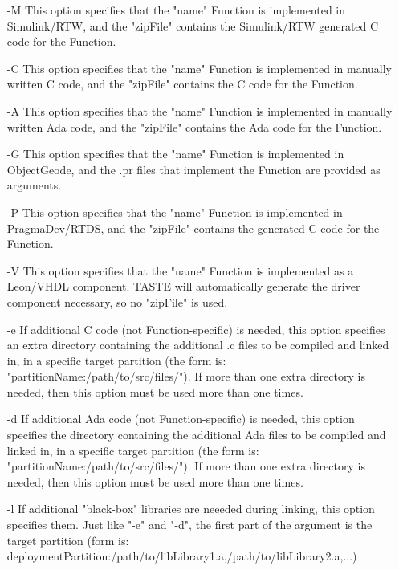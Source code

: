 \documentclass[11pt]{book}
\begin{document}
\begin{itemize}
\item[-M] This option specifies that the "name" Function is implemented in Simulink/RTW,
        and the "zipFile" contains the Simulink/RTW generated C code for the Function.

\item[-C] This option specifies that the "name" Function is implemented in manually written C code,
        and the "zipFile" contains the C code for the Function.

\item[-A] This option specifies that the "name" Function is implemented in manually written Ada code,
        and the "zipFile" contains the Ada code for the Function.

\item[-G] This option specifies that the "name" Function is implemented in ObjectGeode,
        and the .pr files that implement the Function are provided as arguments.

\item[-P] This option specifies that the "name" Function is implemented in PragmaDev/RTDS,
        and the "zipFile" contains the generated C code for the Function.

\item[-V] This option specifies that the "name" Function is implemented as a Leon/VHDL component.
        TASTE will automatically generate the driver component necessary, so no "zipFile" is used.

\item[-e] If additional C code (not Function-specific) is needed, this option specifies an extra directory 
         containing the additional .c files to be compiled and linked in, in a specific target partition 
	 (the form is: "partitionName:/path/to/src/files/"). If more than one extra directory is
         needed, then this option must be used more than one times.

\item[-d] If additional Ada code (not Function-specific) is needed, this option specifies the directory 
         containing the additional Ada files to be compiled and linked in, in a specific target partition 
	 (the form is: "partitionName:/path/to/src/files/"). If more than one extra directory is
         needed, then this option must be used more than one times.

\item[-l] If additional "black-box" libraries are neeeded during linking, this option specifies them.
          Just like "-e" and "-d", the first part of the argument is the target partition (form is:
	  deploymentPartition:/path/to/libLibrary1.a,/path/to/libLibrary2.a,...)

\end{itemize}
\end{document}
